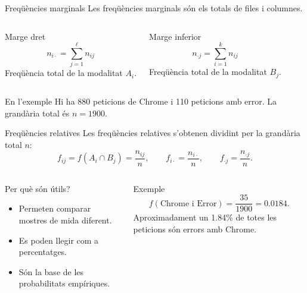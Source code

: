 \documentclass[10pt,aspectratio=169]{beamer}
\begin{document}
\begin{frame}{Freqüències marginals}
Les freqüències marginals són els totals de files i columnes.
\vspace{0.2cm}
\begin{columns}[T]
\begin{block}{Marge dret}
\[
 n_{i\cdot}=\sum_{j=1}^{\ell} n_{ij}
\]
Freqüència total de la modalitat $A_i$.
\end{block}
\begin{block}{Marge inferior}
\[
 n_{\cdot j}=\sum_{i=1}^{k} n_{ij}
\]
Freqüència total de la modalitat $B_j$.
\end{block}
\end{columns}
\vspace{0.3cm}
\begin{exampleblock}{En l'exemple}
Hi ha 880 peticions de Chrome i 110 peticions amb error. La grandària total és $n=1900$.
\end{exampleblock}
\end{frame}

\begin{frame}{Freqüències relatives}
Les freqüències relatives s'obtenen dividint per la grandària total $n$:
\[
 f_{ij}=f(A_i\cap B_j)=\frac{n_{ij}}{n},\qquad
 f_{i\cdot}=\frac{n_{i\cdot}}{n},\qquad
 f_{\cdot j}=\frac{n_{\cdot j}}{n}.
\]
\vspace{0.15cm}
\begin{columns}[T]
\begin{block}{Per què són útils?}
\begin{itemize}
  \item Permeten comparar mostres de mida diferent.
  \item Es poden llegir com a percentatges.
  \item Són la base de les probabilitats empíriques.
\end{itemize}
\end{block}
\begin{exampleblock}{Exemple}
\[
 f(\text{Chrome i Error})=\frac{35}{1900}=0.0184.
\]
Aproximadament un 1.84\% de totes les peticions són errors amb Chrome.
\end{exampleblock}
\end{columns}
\end{frame}
\end{document}
